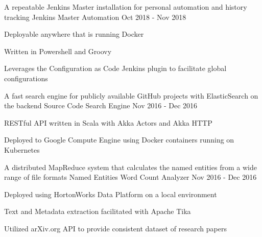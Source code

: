 
\begin{cventries}

  \cventry
    {A repeatable Jenkins Master installation for personal automation and history tracking} %
    {Jenkins Master Automation} %
    {} %
    {Oct 2018 - Nov 2018} %
    {
      \begin{cvitems} %
        \item {Deployable anywhere that is running Docker}
        \item {Written in Powershell and Groovy}
        \item {Leverages the Configuration as Code Jenkins plugin to facilitate global configurations}
      \end{cvitems}
    }

  \cventry
    {A fast search engine for publicly available GitHub projects with ElasticSearch on the backend} %
    {Source Code Search Engine} %
    {} %
    {Nov 2016 - Dec 2016} %
    {
      \begin{cvitems} %
        \item {RESTful API written in Scala with Akka Actors and Akka HTTP}
        \item {Deployed to Google Compute Engine using Docker containers running on Kubernetes}
      \end{cvitems}
    }

  \cventry
    {A distributed MapReduce system that calculates the named entities from a wide range of file formats} %
    {Named Entities Word Count Analyzer} %
    {} %
    {Nov 2016 - Dec 2016} %
    {
      \begin{cvitems} %
        \item {Deployed using HortonWorks Data Platform on a local environment}
        \item {Text and Metadata extraction facilitated with Apache Tika}
        \item {Utilized arXiv.org API to provide consistent dataset of research papers}
      \end{cvitems}
    }


\end{cventries}
